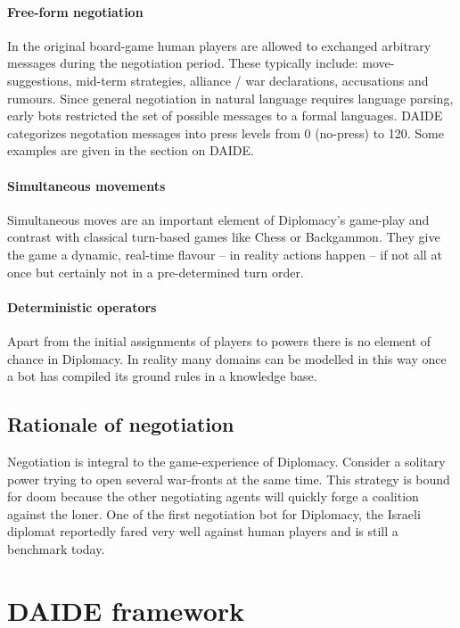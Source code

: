 \documentclass[pdftex,11pt,a4paper]{report}
\begin{document}
\paragraph{Free-form negotiation}
In the original board-game human players are allowed to exchanged
arbitrary messages during the negotiation period. These typically
include: move-suggestions, mid-term strategies, alliance / war
declarations, accusations and rumours. Since general negotiation
in natural language requires language parsing, early 
bots \cite{Kraus92} restricted the set of possible messages to 
a formal languages. DAIDE categorizes negotation messages 
into press levels \cite{DAIDEsyntax10} from 0 (no-press) to 120.
Some examples are given in the section on DAIDE.

\paragraph{Simultaneous movements} 
Simultaneous moves are an important element of Diplomacy's game-play
and contrast with classical turn-based games like Chess or
Backgammon. They give the game a dynamic, real-time flavour -- in
reality actions happen -- if not all at once but certainly not in a
pre-determined turn order.

\paragraph{Deterministic operators}
Apart from the initial assignments of players to powers there is no
element of chance in Diplomacy. In reality many domains can be
modelled in this way once a bot has compiled its ground rules in a
knowledge base.

\subsection{Rationale of negotiation}

Negotiation is integral to the game-experience of Diplomacy. Consider
a solitary power trying to open several war-fronts at the same
time. This strategy is bound for doom because the other negotiating
agents will quickly forge a coalition against the loner. One of the
first negotiation bot for Diplomacy, the Israeli diplomat \cite{Kraus89}
reportedly fared very well against human players and is still a 
benchmark today.

\pagebreak

\section{DAIDE framework}
\end{document}
